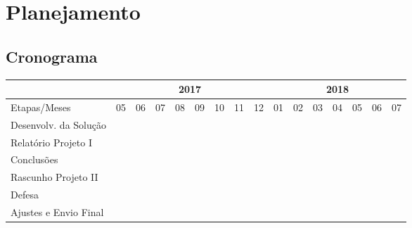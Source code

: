 \documentclass[
	12pt,				%
	openright,			%
	twoside,			%
	a4paper,			%
	english,			%
	brazil,				%
	]{abntex2}
\begin{document}




\chapter{Planejamento}

\section{Cronograma}

\newcommand{\cc}{\cellcolor{black!25}}  %

\begin{flushleft}
\begin{tabular}{|l|c|c|c|c|c|c|c|c|c|c|c|c|c|c|c|}
\hline
       & \multicolumn{8}{c|}{2017} & \multicolumn{7}{c|}{2018}\\ \hline
       
Etapas/Meses & 05 & 06 & 07 & 08 & 09 & 10 & 11 & 12 & 01 & 02 & 03 & 04 & 05 & 06 & 07 \\ \hline
Desenvolv. da Solução  & \cc & \cc & \cc & \cc & \cc & \cc & \cc & \cc & \cc & \cc & &  &  &  & \\ \hline
Relatório Projeto I  & & &  &  &  &  & \cc & &  &  &  &  &  &  & \\ \hline
Conclusões  & & &  &  &  &  &  &  &  & \cc & \cc & &  &  & \\ \hline
Rascunho Projeto II  & & &  &  &  &  &  &  &  &  &  & \cc & &  & \\ \hline
Defesa  & & &  &  &  &  &  &  &  &  &  &  & \cc & & \\ \hline
Ajustes e Envio Final  & & &  &  &  &  &  &  &  &  &  &  & \cc & \cc & \cc \\ \hline
\end{tabular}
\end{flushleft}
\end{document}
